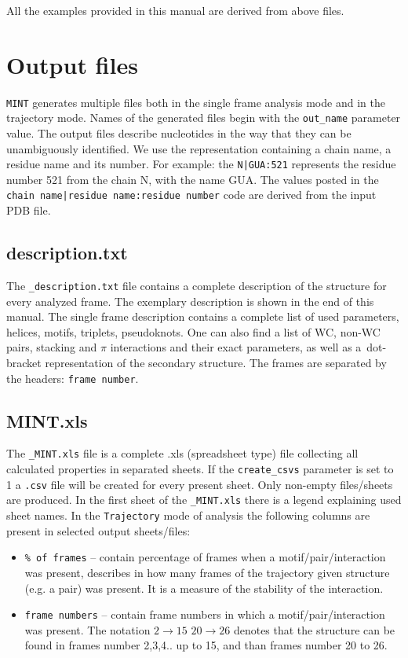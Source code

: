 \documentclass[12pt]{article}
\begin{document}
All the examples provided in this manual are derived from above files.

\section{Output files}\label{OutputFiles}
{\tt MINT} generates multiple files both in the single frame analysis mode and in the trajectory mode. Names of the generated files begin with the {\tt out\_name} parameter value. 
The output files describe nucleotides in the way that they can be unambiguously identified. We use the representation containing a chain name, a residue name and its number. For example: the {\tt N|GUA:521} represents the residue number 521 from the chain N, with the name GUA. The values posted in the {\tt chain name|residue name:residue number} code are derived from the input PDB file.

\subsection{description.txt}
The {\tt \_description.txt} file contains a complete description of the structure for every analyzed frame. The exemplary description is shown in the end of this manual. The single frame description contains a complete list of used parameters, helices, motifs, triplets, pseudoknots. One can also find a list of  WC, non-WC pairs, stacking and $\pi$ interactions and their exact parameters, as well as a~dot-bracket representation of the secondary structure. The frames are separated by the headers: {\tt frame number}.

\subsection{MINT.xls}
The {\tt \_MINT.xls} file is a complete .xls (spreadsheet type) file collecting all calculated properties in separated sheets. If the {\tt create\_csvs} parameter is set to 1 a {\tt .csv} file will be created for every present sheet. Only non-empty files/sheets are produced. 
In the first sheet of the {\tt \_MINT.xls}  there is a legend explaining used sheet names.
In the {\tt Trajectory} mode of analysis the following columns are present in selected output sheets/files:
\begin{itemize}
\item {\tt  \% of frames} -- contain percentage of frames when a motif/pair/interaction was present, describes in how many frames of the trajectory given structure (e.g. a pair) was present. It is a measure of the stability of the interaction.
\item {\tt frame numbers} --  contain frame numbers in which a motif/pair/interaction was present. The notation $ 2\rightarrow 15$ $20\rightarrow 26$ denotes that the structure can be found in frames number 2,3,4.. up to 15, and than frames number 20 to 26.
\end{itemize}
\end{document}

